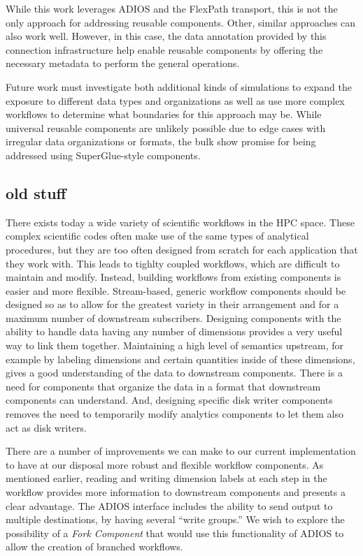 \documentclass[conference]{IEEEtran}
\begin{document}
While this work leverages ADIOS and the FlexPath transport, this is not the
only approach for addressing reusable components. Other, similar approaches can
also work well. However, in this case, the data annotation provided by this
connection infrastructure help enable reusable components by offering the
necessary metadata to perform the general operations.

Future work must investigate both additional kinds of simulations to expand the
exposure to different data types and organizations as well as use more complex
workflows to determine what boundaries for this approach may be. While
universal reusable components are unlikely possible due to edge cases with
irregular data organizations or formats, the bulk show promise for being
addressed using SuperGlue-style components.

\subsection{old stuff}

There exists today a wide variety of scientific workflows in the HPC space.
These complex scientific codes often make use of the same types of analytical
procedures, but they are too often designed from scratch for each application
that they work with. This leads to tighlty coupled workflows, which are
difficult to maintain and modify. Instead, building workflows from existing
components is easier and more flexible. Stream-based, generic workflow
components should be designed so as to allow for the greatest variety in their
arrangement and for a maximum number of downstream subscribers. Designing
components with the ability to handle data having any number of dimensions
provides a very useful way to link them together. Maintaining a high level of
semantics upstream, for example by labeling dimensions and certain quantities
inside of these dimensions, gives a good understanding of the data to
downstream components. There is a need for components that organize the data in
a format that downstream components can understand. And, designing specific
disk writer components removes the need to temporarily modify analytics
components to let them also act as disk writers.

There are a number of improvements we can make to our current implementation to
have at our disposal more robust and flexible workflow components. As mentioned
earlier, reading and writing dimension labels at each step in the workflow
provides more information to downstream components and presents a clear
advantage. The ADIOS interface includes the ability to send output to multiple
destinations, by having several ``write groups.'' We wish to explore the
possibility of a {\em Fork Component} that would use this functionality of
ADIOS to allow the creation of branched workflows.
\end{document}
